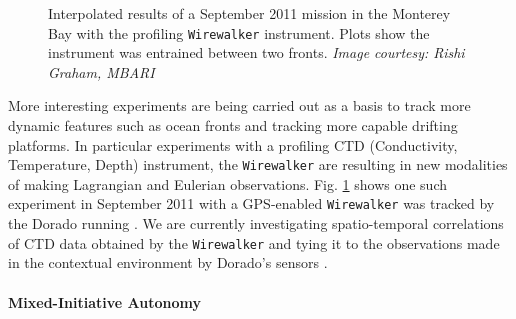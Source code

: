 \begin{figure}
\caption{\small Interpolated results of a September 2011 \rx mission
  in the Monterey Bay with the profiling \texttt{Wirewalker}
  \cite{rainville01,pinkel11} instrument. Plots show the instrument
  was entrained between two fronts. \emph{Image courtesy: Rishi
    Graham, MBARI}}
  \label{fig:sept11-wirewalker}
\end{figure}

More interesting experiments are being carried out as a basis to track
more dynamic features such as ocean fronts \cite{fronts11} and
tracking more capable drifting platforms. In particular experiments
with a profiling CTD (Conductivity, Temperature, Depth) instrument,
the \texttt{Wirewalker} \cite{pinkel11} are resulting in new
modalities of making Lagrangian and Eulerian
observations. Fig. \ref{fig:sept11-wirewalker} shows one such
experiment in September 2011 with a GPS-enabled \texttt{Wirewalker}
was tracked by the Dorado running \rxe. We are currently investigating
spatio-temporal correlations \cite{gneiting07} of CTD data obtained by
the \texttt{Wirewalker} and tying it to the observations made in the
contextual environment by Dorado's sensors \cite{graham12}.

\paragraph {Mixed-Initiative Autonomy}

